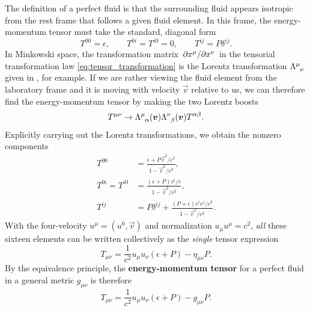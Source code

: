 The definition of a perfect fluid is that the surrounding fluid appears isotropic from the rest frame that follows a given fluid element.
In this frame, the energy-momentum tensor must take the standard, diagonal form
\begin{equation}
	T^{00} = \epsilon , \qquad
	T^{0i} = T^{i0} = 0 , \qquad
	T^{ij} = P \delta^{ij} .
\end{equation}
In Minkowski space, the transformation matrix $\pdv{x^\mu}/{x^\nu}$ in the tensorial transformation law \eqref{eq:tensor_transformation} is the Lorentz transformation $\Lambda\indices{^\mu_\nu}$ given in \cite{ref:mika_gr_notes}, for example.
If we are rather viewing the fluid element from the laboratory frame and it is moving with velocity $\vec{v}$ relative to us, we can therefore find the energy-momentum tensor by making the two Lorentz boosts
\begin{equation}
	T^{\mu \nu} \rightarrow \Lambda\indices{^\mu_\alpha}(\vec{v}) \Lambda\indices{^\nu_\beta}(\vec{v}) T^{\alpha \beta} .
\end{equation}
Explicitly carrying out the Lorentz transformations, we obtain the nonzero components
\begin{subequations}
\begin{align}
	T^{00} &= \frac{\epsilon + P \vec{v}^2 / c^2}{1 - \vec{v}^2 / c^2}, \\
	T^{0i} = T^{i0} &= \frac{(\epsilon + P) v^i / c}{1 - \vec{v}^2 / c^2}, \\
	T^{ij} &= P \delta^{ij} + \frac{(P + \epsilon) v^i v^j / c^2}{1 - \vec{v}^2 / c^2} .
\end{align}
\end{subequations}
With the four-velocity $u^\mu = (u^0, \vec{v})$ and normalization $u_\mu u^\mu = c^2$, \emph{all} these sixteen elements can be written collectively as the \emph{single} tensor expression
\begin{equation}
	T_{\mu \nu} = \frac{1}{c^2} u_\mu u_\nu (\epsilon + P) - \eta_{\mu \nu} P .
\end{equation}
By the equivalence principle, the \textbf{energy-momentum tensor} for a perfect fluid in a general metric $g_{\mu \nu}$ is therefore
\begin{equation}
	T_{\mu \nu} = \frac{1}{c^2} u_\mu u_\nu (\epsilon + P) - g_{\mu \nu} P .
\label{eq:relfluid:energy_momentum}
\end{equation}

